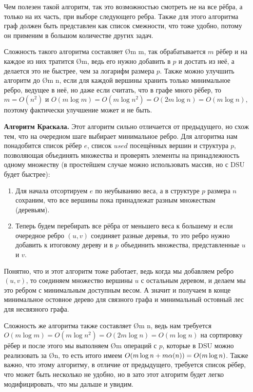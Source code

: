 Чем полезен такой алгоритм, так это возможностью смотреть не на все рёбра, а только на их часть, при выборе следующего ребра. Также для этого алгоритма граф должен быть представлен как список смежности, что тоже удобно, потому он применим в большом количестве других задач. 

Сложность такого алгоритма составляет \O{m \log m}, так обрабатывается $m$ рёбер и на каждое из них тратится \O{\log m}, ведь его нужно добавить в $p$ и достать из неё, а делается это не быстрее, чем за логарифм размера $p$. Также можно улучшить алгоритм до \O{m \log n}, если для каждой вершины хранить только минимальное ребро, ведущее в неё, но даже если считать, что в графе много рёбер, то $m = O(n^2)$ и $O(m \log m) = O(m \log n^2) = O(2m \log n) = O(m \log n)$, поэтому фактически улучшение может и не быть.

\textbf{Алгоритм Краскала.} Этот алгоритм сильно отличается от предыдущего, но схож тем, что на очередном шаге выбирает минимальное ребро. Для алгоритма нам понадобится список рёбер $e$, список $used$ посещённых вершин и структура $p$, позволяющая объединять множества и проверять элементы на принадлежность одному множеству (в простейшем случае можно использовать массив, но с DSU будет быстрее):

\begin{enumerate}
    \item Для начала отсортируем $e$ по неубыванию веса, а в структуре $p$ размера $n$ сохраним, что все вершины пока принадлежат разным множествам (деревьям).
    \item Теперь будем перебирать все рёбра от меньшего веса к большему и если очередное ребро $(u, v)$ соединяет разные деревья, то это ребро нужно добавить к итоговому дереву и в $p$ объединить множества, представленные $u$ и $v$.
\end{enumerate}

Понятно, что и этот алгоритм тоже работает, ведь когда мы добавляем ребро $(u, v)$, то соединяем множество вершины $u$ с остальным деревом, и делаем мы это ребром с минимальным доступным весом. А значит и получаем в конце минимальное остовное дерево для связного графа и минимальный остовный лес для несвязного графа.

Сложность же алгоритма также составляет \O{m \log n}, ведь нам требуется $O(m \log m) = O(m \log n^2) = O(2m \log n) = O(m \log n)$ на сортировку рёбер и после этого мы выполняем \O{m} операций с $p$, которые в DSU можно реализовать за \O{\ac{n}}, то есть итого имеем $O(m \log n + m \alpha(n)) = O(m \log n)$. Также важно, что этому алгоритму, в отличие от предыдущего, требуется список рёбер, что может быть несколько не удобно, но в зато этот алгоритм будет легко модифицировать, что мы дальше и увидим.


